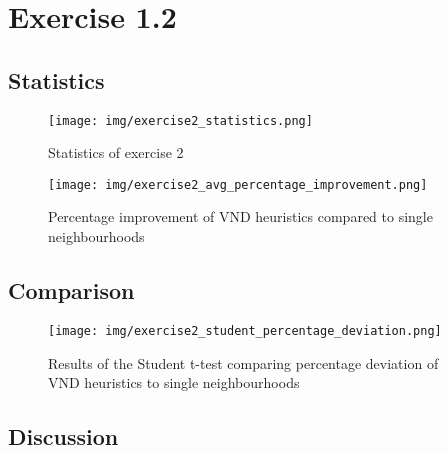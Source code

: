 \documentclass[a4paper,10pt]{article}
\begin{document}
\section{Exercise 1.2}

\subsection{Statistics}

\begin{figure}[H]
	\centering
	\caption{Statistics of exercise 2}
	\texttt{[image: img/exercise2\_statistics.png]}
\end{figure}


\begin{figure}[H]
	\centering
	\caption{Percentage improvement of VND heuristics compared to single neighbourhoods}
	\texttt{[image: img/exercise2\_avg\_percentage\_improvement.png]}
\end{figure}

\subsection{Comparison}

\begin{figure}[H]
	\centering
	\caption{Results of the Student t-test comparing percentage deviation of VND heuristics to single neighbourhoods}
	\texttt{[image: img/exercise2\_student\_percentage\_deviation.png]}
\end{figure}

\subsection{Discussion}
\end{document}
